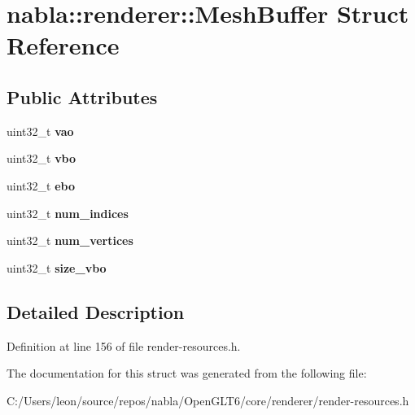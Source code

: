 \hypertarget{structnabla_1_1renderer_1_1_mesh_buffer}{}\section{nabla\+::renderer\+::Mesh\+Buffer Struct Reference}
\label{structnabla_1_1renderer_1_1_mesh_buffer}
\subsection*{Public Attributes}
\begin{DoxyCompactItemize}
\item 
\mbox{\label{structnabla_1_1renderer_1_1_mesh_buffer_ad5aebf178d589d2f62b815c5b9acd286}} 
uint32\+\_\+t {\bfseries vao}
\item 
\mbox{\label{structnabla_1_1renderer_1_1_mesh_buffer_aed5ed98b81b95a3ecfaf100a4ddb1c8e}} 
uint32\+\_\+t {\bfseries vbo}
\item 
\mbox{\label{structnabla_1_1renderer_1_1_mesh_buffer_ae45b2a3a18902a2e217a7f38389a98ac}} 
uint32\+\_\+t {\bfseries ebo}
\item 
\mbox{\label{structnabla_1_1renderer_1_1_mesh_buffer_adac5ebd5335b3bc92f77f5749d371da4}} 
uint32\+\_\+t {\bfseries num\+\_\+indices}
\item 
\mbox{\label{structnabla_1_1renderer_1_1_mesh_buffer_a84ff39d5d7980afe87f89ca975346703}} 
uint32\+\_\+t {\bfseries num\+\_\+vertices}
\item 
\mbox{\label{structnabla_1_1renderer_1_1_mesh_buffer_aa2f00f783d26acf789b0a946f7ed42d5}} 
uint32\+\_\+t {\bfseries size\+\_\+vbo}
\end{DoxyCompactItemize}


\subsection{Detailed Description}


Definition at line 156 of file render-\/resources.\+h.



The documentation for this struct was generated from the following file\+:\begin{DoxyCompactItemize}
\item 
C\+:/\+Users/leon/source/repos/nabla/\+Open\+G\+L\+T6/core/renderer/render-\/resources.\+h\end{DoxyCompactItemize}
